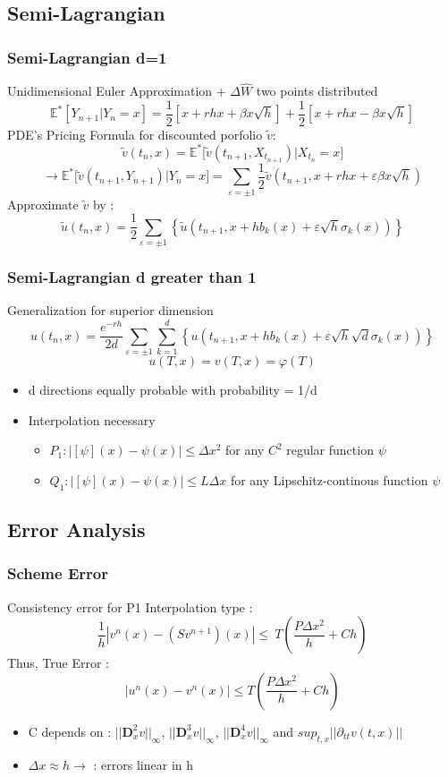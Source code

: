 \documentclass[]{beamer}
\begin{document}
\subsection{Semi-Lagrangian}
\begin{frame}
\frametitle{Semi-Lagrangian d=1}
Unidimensional Euler Approximation + $\Delta \hat{W}$ two points distributed
\[\mathbb{E}^*[Y_{n+1}|Y_n=x] =\frac{1}{2}\left\lbrack x+rhx+\beta x
\sqrt{h}\right\rbrack +\frac{1}{2}\left\lbrack x+rhx-\beta x \sqrt{h} 
\right\rbrack\]
PDE's Pricing Formula for discounted porfolio $\tilde{v}$: 
\[\tilde{v}(t_{n},x)=\mathbb{E}^*\lbrack\tilde{v}(t_{n+1},X_{t_{n+1}})|X_{t_n}=x\rbrack\]
\[\longrightarrow \mathbb{E}^*\lbrack\tilde{v}(t_{n+1},Y_{n+1})|Y_{n}=x\rbrack 
= \sum_{\varepsilon=\pm 1}\frac{1}{2}\tilde{v}(t_{n+1},x+rhx+\varepsilon\beta x \sqrt{h})
\]
Approximate $\tilde{v}$ by : 
\[\tilde{u}(t_{n},x)= \frac{1}{2} \sum_{\varepsilon = \pm1} 
\left\{
\tilde{u}\left(t_{n+1},x + hb_k(x) + \varepsilon \sqrt{h} \sigma_k (x) \right)
\right\}\]
\end{frame}
\begin{frame}
\frametitle{Semi-Lagrangian d greater than 1}
Generalization for superior dimension 
\[u(t_{n},x)= \frac{e^{-rh}}{2d} \sum_{\varepsilon = \pm1} \sum_{k=1}^d 
\left\{
u\left(	t_{n+1},x + hb_k(x) + \varepsilon \sqrt{h} \sqrt{d}  \sigma_k (x) \right)
\right\} \]
\[u(T,x) = v(T,x)= \varphi(T)
\]
\begin{itemize}
 \item d directions equally probable with probability = 1/d
 \item Interpolation necessary 
 \begin{itemize}
  \item $P_1: |[\psi ](x)-\psi(x)|\leq\Delta x^2 $ for any $C^2$ regular function $\psi$
  \item $Q_1: |[\psi ](x)-\psi(x)|\leq L\Delta x  $ for any Lipschitz-continous function $\psi$
 \end{itemize}

\end{itemize}
\end{frame}
\subsection{Error Analysis}
\begin{frame}
\frametitle{Scheme Error}
Consistency error for P1 Interpolation type : 
\[ \frac{1}{h} |v^n(x) -(Sv^{n+1})(x)| \leq\  T(\frac{P\Delta x^2}{h}+Ch) \]
Thus, True Error : 
\[|u^n(x)-v^n(x)|  \leq T(\frac{P\Delta x^2}{h}+Ch)\]
\begin{itemize}
 \item C depends on : $||\textbf{D}^2_xv||_\infty $, $||\textbf{D}^3_xv||_\infty$, $||\textbf{D}^4_xv||_\infty $ and $sup_{t,x}||\partial_{tt}v(t,x)||$ 
 \item $\Delta x \approx h \longrightarrow$ : errors linear in h 
\end{itemize}
\end{frame}
\end{document}
